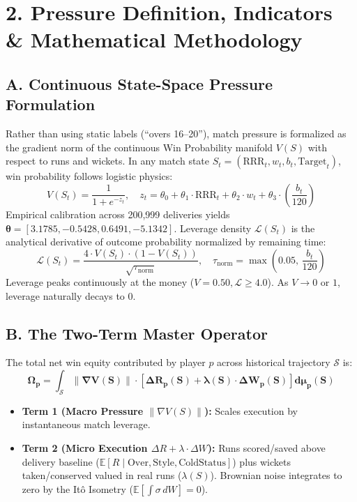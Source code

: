 \documentclass[10pt,a4paper]{article}
\begin{document}
\section*{2. Pressure Definition, Indicators \& Mathematical Methodology}

\subsection*{A. Continuous State-Space Pressure Formulation}
Rather than using static labels (``overs 16--20''), match pressure is formalized as the gradient norm of the continuous Win Probability manifold $V(S)$ with respect to runs and wickets. In any match state $S_t = (\text{RRR}_t, w_t, b_t, \text{Target}_t)$, win probability follows logistic physics:
\begin{equation}
    V(S_t) = \frac{1}{1 + e^{-z_t}}, \quad z_t = \theta_0 + \theta_1 \cdot \text{RRR}_t + \theta_2 \cdot w_t + \theta_3 \cdot \left(\frac{b_t}{120}\right)
\end{equation}
Empirical calibration across 200,999 deliveries yields $\boldsymbol{\theta} = [3.1785, -0.5428, 0.6491, -5.1342]$. Leverage density $\mathcal{L}(S_t)$ is the analytical derivative of outcome probability normalized by remaining time:
\begin{equation}
    \mathcal{L}(S_t) = \frac{4 \cdot V(S_t) \cdot (1 - V(S_t))}{\sqrt{\tau_{\text{norm}}}}, \quad \tau_{\text{norm}} = \max\left(0.05, \, \frac{b_t}{120}\right)
\end{equation}
Leverage peaks continuously at the money ($V=0.50, \mathcal{L} \ge 4.0$). As $V \to 0$ or $1$, leverage naturally decays to 0.

\subsection*{B. The Two-Term Master Operator}
The total net win equity contributed by player $p$ across historical trajectory $\mathcal{S}$ is:
\begin{equation}
    \mathbf{\Omega_p = \int_{\mathcal{S}} \|\nabla V(S)\| \cdot \left[ \Delta R_p(S) + \lambda(S) \cdot \Delta W_p(S) \right] d\mu_p(S)}
\end{equation}
\begin{itemize}[leftmargin=1.2em]
    \item \textbf{Term 1 (Macro Pressure $\|\nabla V(S)\|$):} Scales execution by instantaneous match leverage.
    \item \textbf{Term 2 (Micro Execution $\Delta R + \lambda \cdot \Delta W$):} Runs scored/saved above delivery baseline ($\mathbb{E}[R \mid \text{Over}, \text{Style}, \text{ColdStatus}]$) plus wickets taken/conserved valued in real runs ($\lambda(S)$). Brownian noise integrates to zero by the It\^o Isometry ($\mathbb{E}[\int \sigma \, dW] = 0$).
\end{itemize}
\end{document}
